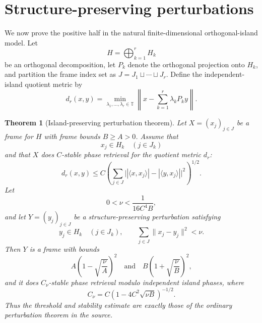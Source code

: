\documentclass[11pt]{article}
\newtheorem{theorem}{Theorem}
\newcommand{\T}{\mathbb T}
\begin{document}
\section{Structure-preserving perturbations}

We now prove the positive half in the natural finite-dimensional
orthogonal-island model. Let
\[
 H=\bigoplus_{k=1}^r H_k
\]
be an orthogonal decomposition, let $P_k$ denote the orthogonal projection
onto $H_k$, and partition the frame index set as
$J=J_1\sqcup\cdots\sqcup J_r$. Define the independent-island quotient metric
by
\begin{equation}\label{eq:blockmetric}
 d_r(x,y)=\min_{\lambda_1,\ldots,\lambda_r\in\T}
 \left\|x-\sum_{k=1}^r\lambda_kP_ky\right\|.
\end{equation}

\begin{theorem}[Island-preserving perturbation theorem]\label{thm:positive}
Let $X=(x_j)_{j\in J}$ be a frame for $H$ with frame bounds
$B\geq A>0$. Assume that
\[
 x_j\in H_k\quad(j\in J_k)
\]
and that $X$ does $C$-stable phase retrieval for the quotient metric $d_r$:
\[
 d_r(x,y)\leq C
 \left(\sum_{j\in J}
 \big||\langle x,x_j\rangle|-|\langle y,x_j\rangle|\big|^2\right)^{1/2}.
\]
Let
\[
 0<\nu<\frac{1}{16C^4B},
\]
and let $Y=(y_j)_{j\in J}$ be a structure-preserving perturbation satisfying
\[
 y_j\in H_k\quad(j\in J_k),
 \qquad \sum_{j\in J}\|x_j-y_j\|^2<\nu.
\]
Then $Y$ is a frame with bounds
\[
 A\left(1-\sqrt{\frac{\nu}{A}}\right)^2
 \quad\text{and}\quad
 B\left(1+\sqrt{\frac{\nu}{B}}\right)^2,
\]
and it does $C_\nu$-stable phase retrieval modulo independent island phases,
where
\[
 C_\nu=C\left(1-4C^2\sqrt{\nu B}\right)^{-1/2}.
\]
Thus the threshold and stability estimate are exactly those of the ordinary
perturbation theorem in the source.
\end{theorem}
\end{document}
